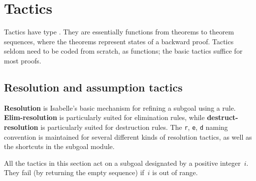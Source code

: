 \chapter{Tactics} \label{tactics}
Tactics have type .  They are essentially
functions from theorems to theorem sequences, where the theorems represent
states of a backward proof.  Tactics seldom need to be coded from scratch,
as functions; the basic tactics suffice for most proofs.

\section{Resolution and assumption tactics}
{\bf Resolution} is Isabelle's basic mechanism for refining a subgoal using
a rule.  {\bf Elim-resolution} is particularly suited for elimination
rules, while {\bf destruct-resolution} is particularly suited for
destruction rules.  The {\tt r}, {\tt e}, {\tt d} naming convention is
maintained for several different kinds of resolution tactics, as well as
the shortcuts in the subgoal module.

All the tactics in this section act on a subgoal designated by a positive
integer~$i$.  They fail (by returning the empty sequence) if~$i$ is out of
range.

